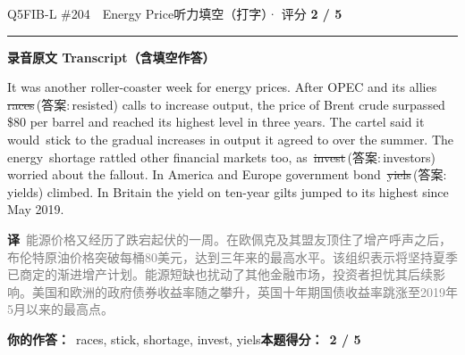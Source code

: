 \documentclass[11pt]{article}
\newcommand{\ptesub}[1]{%
  \par\needspace{2\baselineskip}\smallskip
  {\color{cAccent}\rule[-0.2ex]{3pt}{1.05em}}\hspace{6pt}%
  {\bfseries\color{cHead}#1}\par\nopagebreak\smallskip}
\newcommand{\zh}[1]{{\footnotesize\textcolor{cNote}{\textbf{译}}\ \textcolor{gray}{#1}}}
\newcommand{\rok}[1]{{\color{cFix}\ding{51}\,#1}}                 %
\newcommand{\rno}[2]{{\color{cWrong}\ding{55}\,\sout{#1}}\,{\footnotesize\color{cFix}(答案:\,#2)}}  %
\begin{document}
\begin{qblock}{Q5\quad FIB-L \#204\ \ Energy Price}{听力填空（打字）· 评分 \textcolor{cAccent}{\bfseries 2 / 5}}
\ptesub{录音原文 Transcript（含填空作答）}
\begin{promptbox}
It was another roller-coaster week for energy prices. After OPEC and its allies \rno{races}{resisted} calls to increase output, the price of Brent crude surpassed \$80 per barrel and reached its highest level in three years. The cartel said it would \rok{stick} to the gradual increases in output it agreed to over the summer. The energy \rok{shortage} rattled other financial markets too, as \rno{invest}{investors} worried about the fallout. In America and Europe government bond \rno{yiels}{yields} climbed. In Britain the yield on ten-year gilts jumped to its highest since May 2019.
\end{promptbox}
\zh{能源价格又经历了跌宕起伏的一周。在欧佩克及其盟友顶住了增产呼声之后，布伦特原油价格突破每桶80美元，达到三年来的最高水平。该组织表示将坚持夏季已商定的渐进增产计划。能源短缺也扰动了其他金融市场，投资者担忧其后续影响。美国和欧洲的政府债券收益率随之攀升，英国十年期国债收益率跳涨至2019年5月以来的最高点。}
\par\smallskip
\textbf{你的作答：}\ {\color{cWrong}races}, stick, shortage, {\color{cWrong}invest, yiels}\qquad\textbf{本题得分：}\ {\color{cAccent}\bfseries 2 / 5}
\end{qblock}
\end{document}
